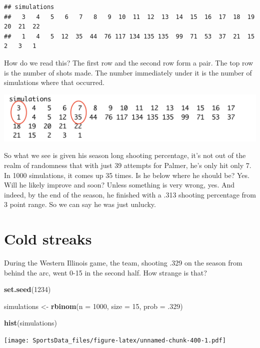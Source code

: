 \documentclass[
]{book}
\newenvironment{Shaded}{\begin{snugshade}}{\end{snugshade}}
\newcommand{\DataTypeTok}[1]{\textcolor[rgb]{0.13,0.29,0.53}{#1}}
\newcommand{\DecValTok}[1]{\textcolor[rgb]{0.00,0.00,0.81}{#1}}
\newcommand{\FloatTok}[1]{\textcolor[rgb]{0.00,0.00,0.81}{#1}}
\newcommand{\KeywordTok}[1]{\textcolor[rgb]{0.13,0.29,0.53}{\textbf{#1}}}
\newcommand{\NormalTok}[1]{#1}
\newcommand{\StringTok}[1]{\textcolor[rgb]{0.31,0.60,0.02}{#1}}
\begin{document}
\begin{verbatim}
## simulations
##   3   4   5   6   7   8   9  10  11  12  13  14  15  16  17  18  19  20  21  22 
##   1   4   5  12  35  44  76 117 134 135 135  99  71  53  37  21  15   2   3   1
\end{verbatim}

How do we read this? The first row and the second row form a pair. The top row is the number of shots made. The number immediately under it is the number of simulations where that occurred.

\includegraphics[width=23.06in]{images/simulations1}

So what we see is given his season long shooting percentage, it's not out of the realm of randomness that with just 39 attempts for Palmer, he's only hit only 7. In 1000 simulations, it comes up 35 times. Is he below where he should be? Yes. Will he likely improve and soon? Unless something is very wrong, yes. And indeed, by the end of the season, he finished with a .313 shooting percentage from 3 point range. So we can say he was just unlucky.

\hypertarget{cold-streaks}{%
\section{Cold streaks}\label{cold-streaks}}

During the Western Illinois game, the team, shooting .329 on the season from behind the arc, went 0-15 in the second half. How strange is that?

\begin{Shaded}
\begin{Highlighting}[]
\KeywordTok{set.seed}\NormalTok{(}\DecValTok{1234}\NormalTok{)}

\NormalTok{simulations <-}\StringTok{ }\KeywordTok{rbinom}\NormalTok{(}\DataTypeTok{n =} \DecValTok{1000}\NormalTok{, }\DataTypeTok{size =} \DecValTok{15}\NormalTok{, }\DataTypeTok{prob =} \FloatTok{.329}\NormalTok{)}

\KeywordTok{hist}\NormalTok{(simulations)}
\end{Highlighting}
\end{Shaded}

\texttt{[image: SportsData\_files/figure-latex/unnamed-chunk-400-1.pdf]}
\end{document}
